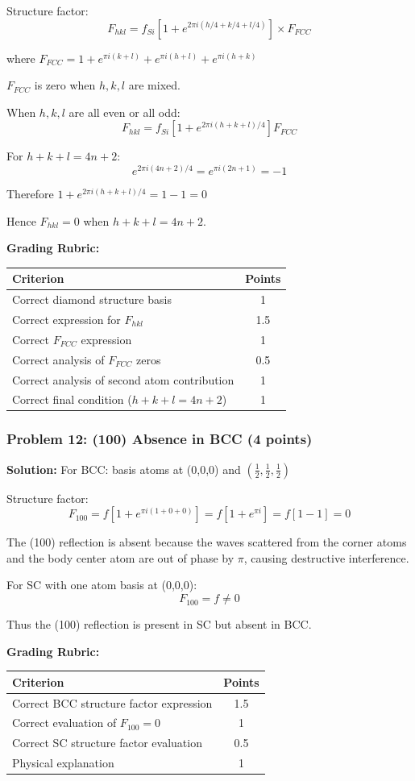 \documentclass[12pt,a4paper]{article}
\begin{document}
Structure factor:
\[F_{hkl} = f_{Si}[1 + e^{2\pi i(h/4 + k/4 + l/4)}] \times F_{FCC}\]

where $F_{FCC} = 1 + e^{\pi i(k+l)} + e^{\pi i(h+l)} + e^{\pi i(h+k)}$

$F_{FCC}$ is zero when $h,k,l$ are mixed.

When $h,k,l$ are all even or all odd:
\[F_{hkl} = f_{Si}[1 + e^{2\pi i(h+k+l)/4}]F_{FCC}\]

For $h + k + l = 4n + 2$:
\[e^{2\pi i(4n+2)/4} = e^{\pi i(2n+1)} = -1\]

Therefore $1 + e^{2\pi i(h+k+l)/4} = 1 - 1 = 0$

Hence $F_{hkl} = 0$ when $h + k + l = 4n + 2$.

\textbf{Grading Rubric:}
\begin{table}[h]
\centering
\begin{tabular}{|p{10cm}|c|}
\hline
\textbf{Criterion} & \textbf{Points} \\
\hline
Correct diamond structure basis & 1 \\
Correct expression for $F_{hkl}$ & 1.5 \\
Correct $F_{FCC}$ expression & 1 \\
Correct analysis of $F_{FCC}$ zeros & 0.5 \\
Correct analysis of second atom contribution & 1 \\
Correct final condition ($h+k+l = 4n+2$) & 1 \\
\hline
\end{tabular}
\end{table}

\subsubsection*{Problem 12: (100) Absence in BCC (4 points)}
\textbf{Solution:}
For BCC: basis atoms at (0,0,0) and $(\frac{1}{2}, \frac{1}{2}, \frac{1}{2})$

Structure factor:
\[F_{100} = f[1 + e^{\pi i(1+0+0)}] = f[1 + e^{\pi i}] = f[1 - 1] = 0\]

The (100) reflection is absent because the waves scattered from the corner atoms and the body center atom are out of phase by $\pi$, causing destructive interference.

For SC with one atom basis at (0,0,0):
\[F_{100} = f \neq 0\]

Thus the (100) reflection is present in SC but absent in BCC.

\textbf{Grading Rubric:}
\begin{table}[h]
\centering
\begin{tabular}{|p{10cm}|c|}
\hline
\textbf{Criterion} & \textbf{Points} \\
\hline
Correct BCC structure factor expression & 1.5 \\
Correct evaluation of $F_{100} = 0$ & 1 \\
Correct SC structure factor evaluation & 0.5 \\
Physical explanation & 1 \\
\hline
\end{tabular}
\end{table}
\end{document}
